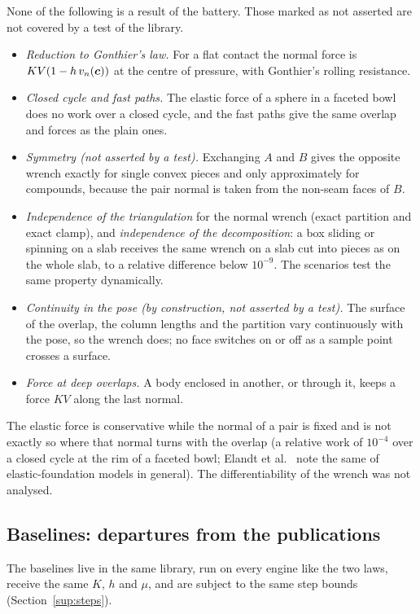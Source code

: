 None of the following is a result of the battery. Those marked as not asserted are not covered
by a test of the library.
\begin{itemize}
\item \emph{Reduction to Gonthier's law.} For a flat contact the normal force is
  $K V(1 - h\,v_n(\boldsymbol{c}))$ at the centre of pressure, with Gonthier's rolling resistance.
\item \emph{Closed cycle and fast paths.} The elastic force of a sphere in a faceted bowl does
  no work over a closed cycle, and the fast paths give the same overlap and forces as the plain
  ones.
\item \emph{Symmetry (not asserted by a test).} Exchanging $A$ and $B$ gives the opposite wrench
  exactly for single convex pieces and only approximately for compounds, because the pair
  normal is taken from the non-seam faces of $B$.
\item \emph{Independence of the triangulation} for the normal wrench (exact partition and exact
  clamp), and \emph{independence of the decomposition}: a box sliding or spinning on a slab
  receives the same wrench on a slab cut into pieces as on the whole slab, to a relative
  difference below $10^{-9}$. The scenarios  test the same property dynamically.
\item \emph{Continuity in the pose (by construction, not asserted by a test).} The surface of
  the overlap, the column lengths and the partition vary continuously with the pose, so the
  wrench does; no face switches on or off as a sample point crosses a surface.
\item \emph{Force at deep overlaps.} A body enclosed in another, or through it, keeps a force
  $K V$ along the last normal.
\end{itemize}
The elastic force is conservative while the normal of a pair is fixed and is not exactly so
where that normal turns with the overlap (a relative work of $10^{-4}$ over a closed cycle at
the rim of a faceted bowl; Elandt et al.~\cite{Elandt2019} note the same of elastic-foundation
models in general). The differentiability of the wrench was not analysed.

\subsection{Baselines: departures from the publications}

The baselines live in the same library, run on every engine like the two laws, receive the same
$K$, $h$ and $\mu$, and are subject to the same step bounds (Section~\ref{sup:steps}).

